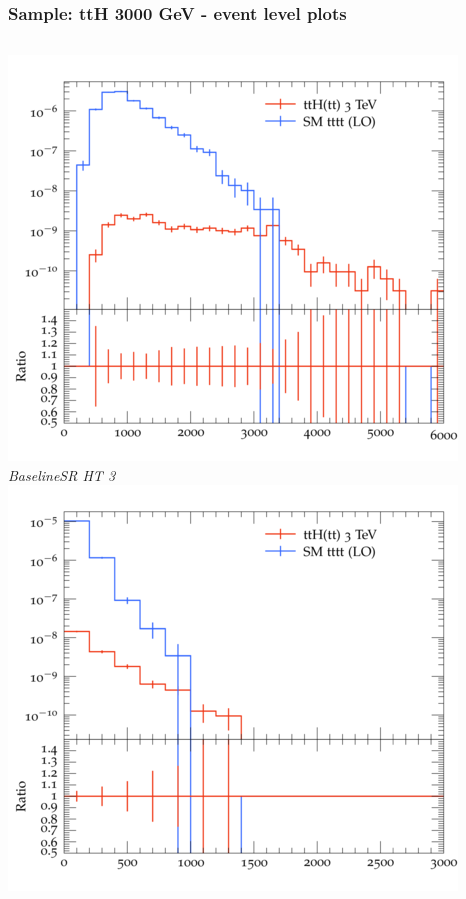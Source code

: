 \documentclass{beamer}
\begin{document}
\begin{frame}
\frametitle{Sample: ttH 3000 GeV - event level plots}
\begin{columns}
\includegraphics[width=\textwidth]{../plots/ttH_3000/tttt_ttH_1LOS/BaselineSR_HT_3.png}\\
\textit{\small BaselineSR HT 3}
\includegraphics[width=\textwidth]{../plots/ttH_3000/tttt_ttH_1LOS/BaselineSR_MET.png}\\

\end{columns}
\end{frame}
\end{document}
